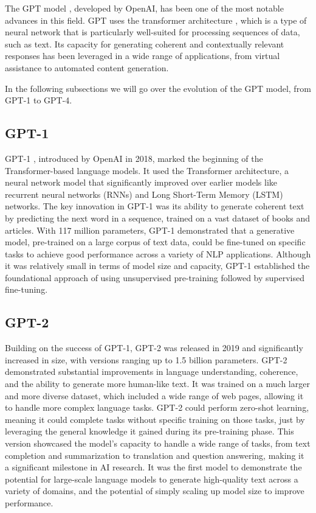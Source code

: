 \documentclass[a4paper,12pt,twoside]{ThesisStyle}
\begin{document}
The GPT model \cite{Radford2018GPT1}, developed by OpenAI, has been one of the most notable advances in this field. GPT uses the transformer architecture \cite{Vaswani2023AttentionNeed}, which is a type of neural network that is particularly well-suited for processing sequences of data, such as text. Its capacity for generating coherent and contextually relevant responses has been leveraged in a wide range of applications, from virtual assistance to automated content generation.

In the following subsections we will go over the evolution of the GPT model, from GPT-1 to GPT-4.

\subsection{GPT-1}
\label{subsec:gpt-1}

GPT-1 \cite{Radford2018GPT1}, introduced by OpenAI in 2018, marked the beginning of the Transformer-based language models. It used the Transformer architecture, a neural network model that significantly improved over earlier models like recurrent neural networks (RNNs) and Long Short-Term Memory (LSTM) networks. The key innovation in GPT-1 was its ability to generate coherent text by predicting the next word in a sequence, trained on a vast dataset of books and articles. With 117 million parameters, GPT-1 demonstrated that a generative model, pre-trained on a large corpus of text data, could be fine-tuned on specific tasks to achieve good performance across a variety of NLP applications. Although it was relatively small in terms of model size and capacity, GPT-1 established the foundational approach of using unsupervised pre-training followed by supervised fine-tuning.

\subsection{GPT-2}
\label{subsec:gpt-2}

Building on the success of GPT-1, GPT-2 \cite{Radford2019GPT2} was released in 2019 and significantly increased in size, with versions ranging up to 1.5 billion parameters. GPT-2 demonstrated substantial improvements in language understanding, coherence, and the ability to generate more human-like text. It was trained on a much larger and more diverse dataset, which included a wide range of web pages, allowing it to handle more complex language tasks. GPT-2 could perform zero-shot learning, meaning it could complete tasks without specific training on those tasks, just by leveraging the general knowledge it gained during its pre-training phase. This version showcased the model's capacity to handle a wide range of tasks, from text completion and summarization to translation and question answering, making it a significant milestone in AI research. It was the first model to demonstrate the potential for large-scale language models to generate high-quality text across a variety of domains, and the potential of simply scaling up model size to improve performance.
\end{document}
